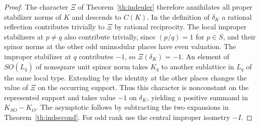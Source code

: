 \begin{proof}
The character \(\Xi\) of Theorem~\ref{th:indeuler} therefore annihilates all proper stabilizer norms of \(K\) and descends to \(C(K)\). In the definition of \(\delta_K\) a rational reflection contributes trivially to \(\Xi\) by rational reciprocity. The local improper stabilizers at \(p\ne q\) also contribute trivially, since \((p/q)=1\) for \(p\in S\), and their spinor norms at the other odd unimodular places have even valuation. The improper stabilizer at \(q\) contributes \(-1\), so \(\Xi(\delta_K)=-1\). An element of \(SO(L_q)\) of nonsquare unit spinor norm takes \(K_q\) to another sublattice in \(L_q\) of the same local type. Extending by the identity at the other places changes the value of \(\Xi\) on the occurring support. Thus this character is nonconstant on the represented support and
takes value $-1$ on $\delta_K$, yielding a positive summand in
$K_{SO}-K_O$. The asymptotic follows by subtracting the two
expansions in Theorem~\ref{th:indsecond}. For odd rank use the central improper isometry \(-I\).
\end{proof}


